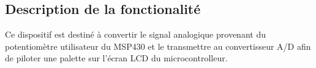 \subsection*{Description de la fonctionalité}
Ce dispositif est destiné à convertir le signal analogique provenant du potentiomètre utilisateur du MSP430 et le transmettre au convertisseur A/D afin de piloter une palette sur l'écran LCD du microcontrolleur.
